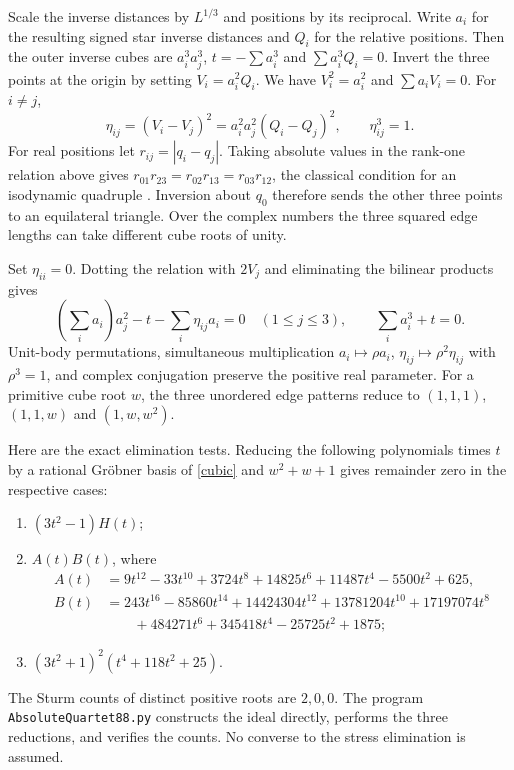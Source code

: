 \documentclass[11pt]{article}
\begin{document}
Scale the inverse distances by $L^{1/3}$ and positions by its reciprocal. Write $a_i$ for the resulting signed star inverse distances and $Q_i$ for the relative positions. Then the outer inverse cubes are $a_i^3a_j^3$, $t=-\sum a_i^3$ and $\sum a_i^3Q_i=0$. Invert the three points at the origin by setting $V_i=a_i^2 Q_i$. We have $V_i^2=a_i^2$ and $\sum a_i V_i=0$. For $i\ne j$,
\[
 \eta_{ij}=(V_i-V_j)^2=a_i^2a_j^2(Q_i-Q_j)^2,\qquad \eta_{ij}^3=1.
\]
For real positions let $r_{ij}=|q_i-q_j|$. Taking absolute values in the rank-one relation above gives $r_{01}r_{23}=r_{02}r_{13}=r_{03}r_{12}$, the classical condition for an isodynamic quadruple \cite[remark following Thm.~3]{Fiedler}. Inversion about $q_0$ therefore sends the other three points to an equilateral triangle. Over the complex numbers the three squared edge lengths can take different cube roots of unity.

Set $\eta_{ii}=0$. Dotting the relation with $2V_j$ and eliminating the bilinear products gives
\begin{equation}\label{cubic}
 (\sum_i a_i)a_j^2-t-\sum_i\eta_{ij}a_i=0\quad (1\leq j\leq 3),
 \qquad \sum_i a_i^3+t=0.
\end{equation}
Unit-body permutations, simultaneous multiplication $a_i\mapsto\rho a_i$, $\eta_{ij}\mapsto\rho^2\eta_{ij}$ with $\rho^3=1$, and complex conjugation preserve the positive real parameter. For a primitive cube root $w$, the three unordered edge patterns reduce to $(1,1,1)$, $(1,1,w)$ and $(1,w,w^2)$.

Here are the exact elimination tests. Reducing the following polynomials times $t$ by a rational Gr\"obner basis of \eqref{cubic} and $w^2+w+1$ gives remainder zero in the respective cases:
\begin{enumerate}
\item $(3t^2-1)H(t)$;
\item $A(t)B(t)$, where
\begin{align*}
 A(t)&=9t^{12}-33t^{10}+3724t^8+14825t^6+11487t^4-5500t^2+625,\\
 B(t)&=243t^{16}-85860t^{14}+14424304t^{12}+13781204t^{10}+17197074t^8\\
 &\qquad{}+484271t^6+345418t^4-25725t^2+1875;
\end{align*}
\item $(3t^2+1)^2(t^4+118t^2+25)$.
\end{enumerate}
The Sturm counts of distinct positive roots are $2,0,0$. The program \texttt{AbsoluteQuartet88.py} constructs the ideal directly, performs the three reductions, and verifies the counts. No converse to the stress elimination is assumed.
\end{document}
